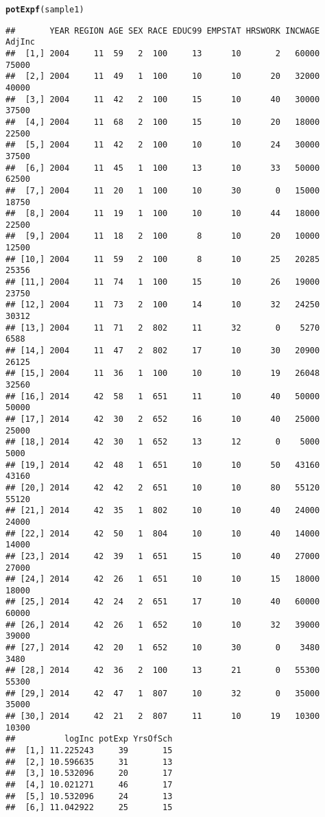 \documentclass{article}\usepackage[]{graphicx}\usepackage[]{color}
\makeatletter
\newcommand{\hlstd}[1]{\textcolor[rgb]{0.345,0.345,0.345}{#1}}%
\newcommand{\hlkwd}[1]{\textcolor[rgb]{0.737,0.353,0.396}{\textbf{#1}}}%
\newenvironment{kframe}{%
 \def\at@end@of@kframe{}%
 \ifinner\ifhmode%
  \def\at@end@of@kframe{\end{minipage}}%
  \begin{minipage}{\columnwidth}%
 \fi\fi%
 \def\FrameCommand##1{\hskip\@totalleftmargin \hskip-\fboxsep
 \colorbox{shadecolor}{##1}\hskip-\fboxsep
     \hskip-\linewidth \hskip-\@totalleftmargin \hskip\columnwidth}%
 \MakeFramed {\advance\hsize-\width
   \@totalleftmargin\z@ \linewidth\hsize
   \@setminipage}}%
 {\par\unskip\endMakeFramed%
 \at@end@of@kframe}
\newenvironment{knitrout}{}{} %
\makeatother
\begin{document}
\begin{knitrout}
\begin{kframe}
\begin{alltt}
\hlkwd{potExpf}\hlstd{(sample1)}
\end{alltt}
\begin{verbatim}
##       YEAR REGION AGE SEX RACE EDUC99 EMPSTAT HRSWORK INCWAGE AdjInc
##  [1,] 2004     11  59   2  100     13      10       2   60000  75000
##  [2,] 2004     11  49   1  100     10      10      20   32000  40000
##  [3,] 2004     11  42   2  100     15      10      40   30000  37500
##  [4,] 2004     11  68   2  100     15      10      20   18000  22500
##  [5,] 2004     11  42   2  100     10      10      24   30000  37500
##  [6,] 2004     11  45   1  100     13      10      33   50000  62500
##  [7,] 2004     11  20   1  100     10      30       0   15000  18750
##  [8,] 2004     11  19   1  100     10      10      44   18000  22500
##  [9,] 2004     11  18   2  100      8      10      20   10000  12500
## [10,] 2004     11  59   2  100      8      10      25   20285  25356
## [11,] 2004     11  74   1  100     15      10      26   19000  23750
## [12,] 2004     11  73   2  100     14      10      32   24250  30312
## [13,] 2004     11  71   2  802     11      32       0    5270   6588
## [14,] 2004     11  47   2  802     17      10      30   20900  26125
## [15,] 2004     11  36   1  100     10      10      19   26048  32560
## [16,] 2014     42  58   1  651     11      10      40   50000  50000
## [17,] 2014     42  30   2  652     16      10      40   25000  25000
## [18,] 2014     42  30   1  652     13      12       0    5000   5000
## [19,] 2014     42  48   1  651     10      10      50   43160  43160
## [20,] 2014     42  42   2  651     10      10      80   55120  55120
## [21,] 2014     42  35   1  802     10      10      40   24000  24000
## [22,] 2014     42  50   1  804     10      10      40   14000  14000
## [23,] 2014     42  39   1  651     15      10      40   27000  27000
## [24,] 2014     42  26   1  651     10      10      15   18000  18000
## [25,] 2014     42  24   2  651     17      10      40   60000  60000
## [26,] 2014     42  26   1  652     10      10      32   39000  39000
## [27,] 2014     42  20   1  652     10      30       0    3480   3480
## [28,] 2014     42  36   2  100     13      21       0   55300  55300
## [29,] 2014     42  47   1  807     10      32       0   35000  35000
## [30,] 2014     42  21   2  807     11      10      19   10300  10300
##          logInc potExp YrsOfSch
##  [1,] 11.225243     39       15
##  [2,] 10.596635     31       13
##  [3,] 10.532096     20       17
##  [4,] 10.021271     46       17
##  [5,] 10.532096     24       13
##  [6,] 11.042922     25       15

\end{verbatim}
\end{kframe}
\end{knitrout}
\end{document}
